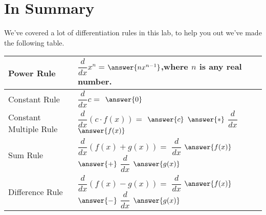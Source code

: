 \documentclass{ximera}
\begin{document}
\section{In Summary}
We've covered a lot of differentiation rules in this lab, to help you out we've made the following table.
\begin{question}
\begin{center}
\renewcommand{\arraystretch}{3}
\begin{tabular}{| l | p{7.5cm} |}
    \hline
    Power Rule & $\dfrac{d}{dx}x^n=$$\answer{nx^{n-1}}$,where $n$ is any real number. \\
    \hline
    Constant Rule & $\dfrac{d}{dx}c =$ $\answer{0}$ \\
    \hline
    Constant Multiple Rule & $\dfrac{d}{dx}(c \cdot f(x))=$ $\answer{c}$ $\answer{*}$ $\dfrac{d}{dx}$ $\answer{f(x)}$ \\
    \hline
    Sum Rule & $\dfrac{d}{dx}(f(x)+g(x))=$ $\dfrac{d}{dx}$ $\answer{f(x)}$ $\answer{+}$ $\dfrac{d}{dx}$ $\answer{g(x)}$ \\
    \hline
    Difference Rule & $\dfrac{d}{dx}(f(x)-g(x))=$ $\dfrac{d}{dx}$ $\answer{f(x)}$ $\answer{-}$
    $\dfrac{d}{dx}$ $\answer{g(x)}$ \\
    \hline
\end{tabular}
\end{center}
\end{question}

\pagebreak
\end{document}
